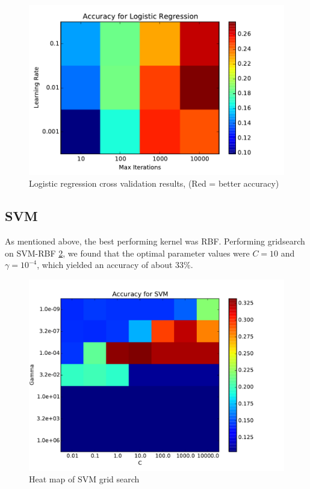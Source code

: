 \documentclass[conference]{IEEEtran}
\begin{document}
\begin{figure}[h]
	\centering
	\includegraphics[scale=0.45]{LR_accuracy.pdf}
	\caption{Logistic regression cross validation results, (Red = better accuracy)}
		\label{LR_accuracy}

\end{figure}


\subsection{SVM}

As mentioned above, the best performing kernel was RBF. Performing gridsearch on SVM-RBF \ref{SVMGrid}, we found that the optimal parameter values were $C=10$ and $\gamma=10^{-4}$, which yielded an accuracy of about 33\%. 


\begin{figure}[h]
	\centering
	\includegraphics[scale=0.4]{SVM_grid_search.pdf}
	\caption{Heat map of SVM grid search}
	\label{SVMGrid}
\end{figure}
\end{document}
